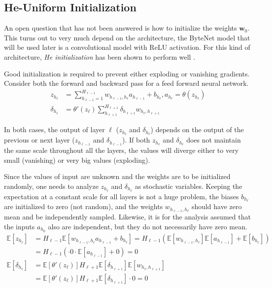 \subsection{He-Uniform Initialization}

An open question that has not been answered is how to initialize the weights $\mathbf{w}_0$. This turns out to very much depend on the architecture, the ByteNet model that will be used later is a convolutional model with ReLU activation. For this kind of architecture, \textit{He initialization} has been shown to perform well \cite{he-initialization}. 

Good initialization is required to prevent either exploding or vanishing gradients. Consider both the forward and backward pass for a feed forward neural network.
\begin{equation}
\begin{aligned}
z_{h_\ell} &= \sum_{h_{\ell-1} = 1}^{H_{\ell-1}} w_{h_{\ell-1}, h_{\ell}} a_{h_{\ell-1}} + b_{h_{\ell}}, a_{h_\ell} = \theta(z_{h_\ell}) \\
\delta_{h_\ell} &= \theta'(z_\ell) \sum_{h_{\ell+1}}^{H_{\ell+1}} \delta_{h_{\ell+1}} w_{h_\ell, h_{\ell+1}}
\end{aligned}
\end{equation}

In both cases, the output of layer $\ell$ ($z_{h_\ell}$ and $\delta_{h_\ell}$) depends on the output of the previous or next layer ($z_{h_{\ell-1}}$ and $\delta_{h_{\ell-1}}$). If both $z_{h_\ell}$ and $\delta_{h_\ell}$ does not maintain the same scale throughout all the layers, the values will diverge either to very small (vanishing) or very big values (exploding).

Since the values of input are unknown and the weights are to be initialized randomly, one needs to analyze $z_{h_\ell}$ and $\delta_{h_\ell}$ as stochastic variables. Keeping the expectation at a constant scale for all layers is not a huge problem, the biases $b_{h_\ell}$ are initialized to zero (not random), and the weights $w_{h_{\ell-1}, h_\ell}$ should have zero mean and be independently sampled. Likewise, it is for the analysis assumed that the inputs $a_{h_0}$ also are independent, but they do not necessarily have zero mean.
\begin{equation}
\begin{aligned}
\mathbb{E}[z_{h_\ell}]
&= H_{\ell-1} \mathbb{E}[w_{h_{\ell-1}, h_{\ell}} a_{h_{\ell-1}} + b_{h_\ell}] = H_{\ell-1} \left(\mathbb{E}[w_{h_{\ell-1}, h_{\ell}}] \mathbb{E}[a_{h_{\ell-1}}] + \mathbb{E}[b_{h_\ell}]\right) \\
&= H_{\ell-1}\left(\cdot 0 \cdot \mathbb{E}[a_{h_{\ell-1}}] + 0\right) = 0 \\
\mathbb{E}[\delta_{h_\ell}] &= \mathbb{E}[\theta'(z_\ell)] H_{\ell + 1} \mathbb{E}[\delta_{h_{\ell+1}}] \mathbb{E}[w_{h_\ell, h_{\ell+1}}] \\
&= \mathbb{E}[\theta'(z_\ell)] H_{\ell + 1} \mathbb{E}[\delta_{h_{\ell+1}}] \cdot 0 = 0
\end{aligned}
\end{equation}

